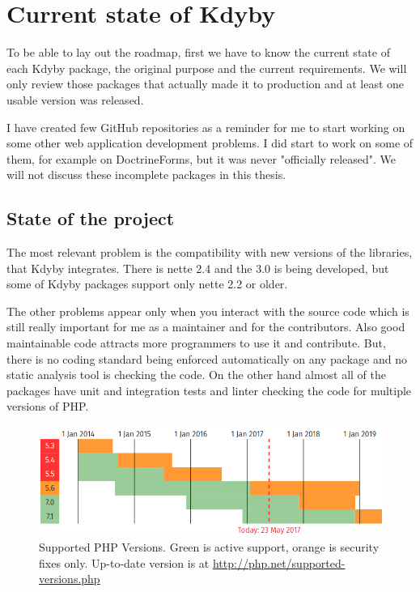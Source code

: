 \chapter{Current state of Kdyby}

To be able to lay out the roadmap, first we have to know the current state of each Kdyby package, the original purpose and the current requirements. We will only review those packages that actually made it to production and at least one usable version was released.

I have created few GitHub repositories as a reminder for me to start working on some other web application development problems. I did start to work on some of them, for example on DoctrineForms, but it was never "officially released". We will not discuss these incomplete packages in this thesis.

\section{State of the project}

The most relevant problem is the compatibility with new versions of the libraries, that Kdyby integrates. There is \gls{nette} 2.4 and the 3.0 is being developed, but some of Kdyby packages support only \gls{nette} 2.2 or older.

The other problems appear only when you interact with the source code which is still really important for me as a maintainer and for the contributors. Also good maintainable code attracts more programmers to use it and contribute. But, there is no coding standard being enforced automatically on any package and no static analysis tool is checking the code. On the other hand almost all of the packages have unit and integration tests and linter checking the code for multiple versions of PHP.

\begin{figure}[h] \label{fig:php:supported-versions}
  \centering
    \includegraphics[width=1\textwidth]{src/assets/php-supported-versions.png}
  \caption{Supported PHP Versions. Green is active support, orange is security fixes only. Up-to-date version is at \url{http://php.net/supported-versions.php}}
\end{figure}

